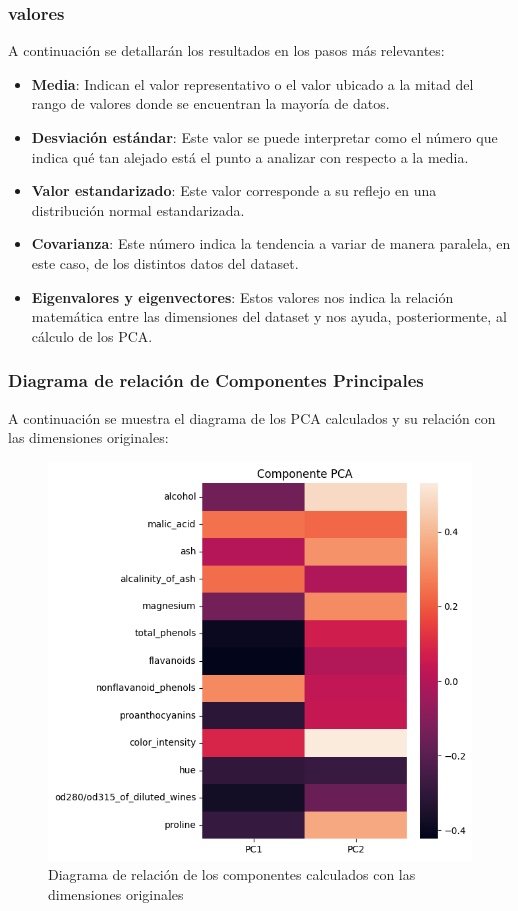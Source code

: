 \subsubsection[Valores]{valores}
A continuación se detallarán los resultados en los pasos más relevantes:
\begin{itemize}
    \item \textbf{Media}: Indican el valor representativo o el valor ubicado a la mitad del rango de valores donde se encuentran la mayoría de datos.
    \item \textbf{Desviación estándar}: Este valor se puede interpretar como el número que indica qué tan alejado está el punto a analizar con respecto a la media.
    \item \textbf{Valor estandarizado}: Este valor corresponde a su reflejo en una distribución normal estandarizada.
    \item \textbf{Covarianza}: Este número indica la tendencia a variar de manera paralela, en este caso, de los distintos datos del dataset.
    \item \textbf{Eigenvalores y eigenvectores}: Estos valores nos indica la relación matemática entre las dimensiones del dataset y nos ayuda, posteriormente, al cálculo de los PCA.
\end{itemize}

\subsubsection[Relación de los PCA]{Diagrama de relación de Componentes Principales}
A continuación se muestra el diagrama de los PCA calculados y su relación con las dimensiones originales:
\begin{center}
    \begin{figure}[!h]
        \centering
        \includegraphics[scale=0.67]{PCACorrelation.png}
        \caption{Diagrama de relación de los componentes calculados con las dimensiones originales}
    \end{figure}
\end{center}

